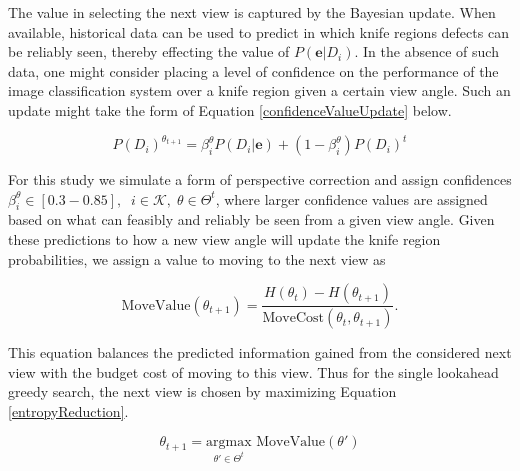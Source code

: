 \documentclass[letterpaper, 10 pt, conference]{ieeeconf}  %
\begin{document}
The value in selecting the next view is captured by the Bayesian update. When available, historical data can be used to predict in which knife regions defects can be reliably seen, thereby effecting the value of $P(\mathbf{e}|D_i)$. In the absence of such data, one might consider placing a level of confidence on the performance of the image classification system over a knife region given a certain view angle. Such an update might take the form of Equation \eqref{confidenceValueUpdate} below.

\begin{equation}
    P(D_i)^{\theta_{t+1}} = \beta_i^{\theta} P(D_i|\mathbf{e}) + (1 - \beta_i^{\theta}) P(D_i)^{t} \label{confidenceValueUpdate}
\end{equation}

For this study we simulate a form of perspective correction and assign confidences $\beta_i^{\theta} \in [0.3 - 0.85], \;\;i\in\mathcal{K},\;\theta\in\Theta^t$, where larger confidence values are assigned based on what can feasibly and reliably be seen from a given view angle. Given these predictions to how a new view angle will update the knife region probabilities, we assign a value to moving to the next view as

\begin{equation}
    \text{MoveValue}(\theta_{t+1}) = \frac{H(\theta_t) - H(\theta_{t+1})}{\text{MoveCost}(\theta_t,\theta_{t+1})}. \label{entropyReduction}
\end{equation}

 This equation balances the predicted information gained from the considered next view with the budget cost of moving to this view. Thus for the single lookahead greedy search, the next view is chosen by maximizing Equation \eqref{entropyReduction}.

\begin{equation}
    \theta_{t+1} = \underset{\theta'\in\Theta^t}{\text{argmax}}\text{ MoveValue}(\theta')
\end{equation}
\end{document}
